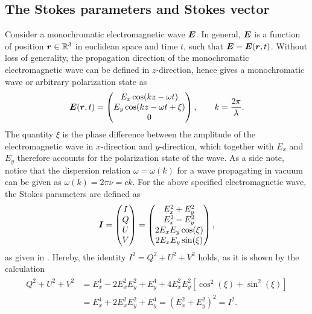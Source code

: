 \documentclass[a4paper,12pt]{report}
\begin{document}
\subsection{The Stokes parameters and Stokes vector}
Consider a monochromatic electromagnetic wave $\bm{E}$. In general, $\bm{E}$ is a function of position $\bm{r} \in \mathbb{R}^3$ in euclidean space and time $t$, such that $\bm{E} = \bm{E}(\bm{r},t)$. Without loss of generality, the propagation direction of the monochromatic electromagnetic wave can be defined in $z$-direction, hence \cite[p.121]{Stix.2002} gives a monochromatic wave or arbitrary polarization state as \begin{equation}\label{eq:E-wave}
\bm{E}(\bm{r},t) = \begin{pmatrix}
E_x \cos(k z - \omega t) \\ E_y \cos(kz-\omega t + \xi) \\ 0
\end{pmatrix}, \qquad k = \frac{2\pi}{\lambda}.
\end{equation} The quantity $\xi$ is the phase difference between the amplitude of the electromagnetic wave in $x$-direction and $y$-direction, which together with $E_x$ and $E_y$ therefore accounts for the polarization state of the wave. As a side note, notice that the dispersion relation $\omega = \omega(k)$ for a wave propagating in vacuum can be given as $\omega(k) = 2\pi\nu = ck$. For the above specified electromagnetic wave, the Stokes parameters are defined as \begin{equation}
\bm{I} = \begin{pmatrix}
I \\ Q \\ U \\ V
\end{pmatrix} = \begin{pmatrix}
E_x^2 + E_y^2 \\ E_x^2 - E_y^2 \\ 2E_xE_y\cos(\xi) \\ 2E_xE_y\sin(\xi)
\end{pmatrix},
\end{equation} as given in \cite[p.121]{Stix.2002}. Hereby, the identity $I^2 = Q^2 + U^2 + V^2$ holds, as it is shown by the calculation \begin{align}
\begin{aligned}
Q^2 + U^2 + V^2 &= E_x^4 - 2E_x^2E_y^2 + E_y^4 + 4E_x^2E_y^2\left[\cos^2(\xi) + \sin^2(\xi)\right] \\
&= E_x^4 + 2E_x^2E_y^2 + E_y^4 = (E_x^2+E_y^2)^2 = I^2.

\end{aligned}
\end{align}
\end{document}
